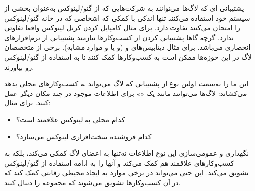پشتیبانی ای که لاگ‌ها می‌توانند به شرکت‌هایی که از گنو/لینوکس
به‌عنوان بخشی از سیستم خود استفاده می‌کنند تنها اندکی با کمکی
که اشخاصی که در خانه گنو/لینوکس را امتحان می‌کنند تفاوت دارد.
برای مثال کامپایل کردن کرنل لینوکس واقعا تفاوتی ندارد.
گرچه گاها پشتیبانی کردن از کسب‌وکار‌ها نیازمند پشتیبانی از
نرم‌افزارهای انحصاری می‌باشد. برای مثال دیتابیس‌های
 و 
(و یا
و موارد مشابه).
برخی از متخصصان لاگ در این حوزه‌ها ممکن است به کسب‌وکار‌ها کمک کنند
تا به استفاده از گنو/لینوکس رو بیاورند.

این ما را به‌سمت اولین نوع از پشتیبانی که لاگ می‌تواند به
کسب‌وکار‌های محلی بدهد می‌کشاند: لاگ‌ها می‌توانند مانند یک
«»
برای اطلاعات موجود در چند مکان دیگر عمل کنند. برای مثال:

\begin{itemize}
\item
کدام  محلی به لینوکس علاقمند است؟
\item
کدام فروشنده سخت‌افزاری  لینوکس می‌سازد؟
\end{itemize}


نگهداری و عمومی‌سازی این نوع اطلاعات نه‌تنها به اعضای لاگ کمکی می‌کند،
بلکه به کسب‌وکارهای علاقمند هم کمک می‌کند و آنها را به ادامه استفاده از
گنو/لینوکس تشویق می‌کند.
این حتی می‌تواند در برخی موارد به ایجاد محیطی رقابتی کمک کند که
در آن کسب‌وکار‌ها تشویق می‌شوند که مجموعه را دنبال کنند.

